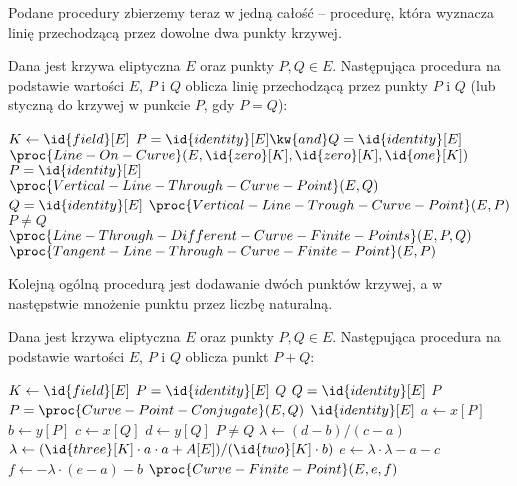Podane procedury zbierzemy teraz w jedną całość --
procedurę, która wyznacza linię przechodzącą przez dowolne dwa punkty krzywej.

\begin{algorithm}
Dana jest krzywa eliptyczna $E$
oraz punkty $P, Q \in E$.
Następująca procedura
na podstawie wartości $E$, $P$ i $Q$
oblicza
linię przechodzącą przez punkty $P$ i $Q$
(lub styczną do krzywej w punkcie $P$, gdy $P = Q$):

\begin{codebox}
\li
    $K \gets \id{field}[E]$
\li
    \If $P = \id{identity}[E] \kw{ and } Q = \id{identity}[E]$
\li
        \Then
            \Return $\proc{Line-On-Curve}(E, \id{zero}[K], \id{zero}[K], \id{one}[K])$
        \End
\li
    \If $P = \id{identity}[E]$
\li
        \Then
            \Return $\proc{Vertical-Line-Through-Curve-Point}(E, Q)$
        \End
\li
    \If $Q = \id{identity}[E]$
\li
        \Then
            \Return $\proc{Vertical-Line-Trough-Curve-Point}(E, P)$
        \End
\li
    \If $P \neq Q$
\li
        \Then
            \Return $\proc{Line-Through-Different-Curve-Finite-Points}(E, P, Q)$
\li
        \Else
            \Return $\proc{Tangent-Line-Through-Curve-Finite-Point}(E, P)$
        \End
\end{codebox}
\end{algorithm}

Kolejną ogólną procedurą jest dodawanie dwóch punktów krzywej,
a w następstwie mnożenie punktu przez liczbę naturalną.

\begin{algorithm}
Dana jest krzywa eliptyczna $E$
oraz punkty $P, Q \in E$.
Następująca procedura
na podstawie wartości $E$, $P$ i $Q$
oblicza
punkt $P + Q$:

\begin{codebox}
\li
    $K \gets \id{field}[E]$
\li
    \If $P = \id{identity}[E]$
\li
        \Then
            \Return $Q$
        \End
\li
    \If $Q = \id{identity}[E]$
\li
        \Then
            \Return $P$
        \End
\li
    \If $P = \proc{Curve-Point-Conjugate}(E, Q)$
\li
        \Then
            \Return $\id{identity}[E]$
        \End
\li
    $a \gets x[P]$
\li
    $b \gets y[P]$
\li
    $c \gets x[Q]$
\li
    $d \gets y[Q]$
\li
    \If $P \neq Q$
\li
        \Then
            $\lambda \gets (d - b)/(c - a)$
\li
        \Else
            $\lambda \gets (\id{three}[K]\cdot a\cdot a + A[E])/(\id{two}[K]\cdot b)$
        \End
\li
    $e \gets \lambda\cdot\lambda - a - c$
\li
    $f \gets -\lambda\cdot(e - a) - b$
\li
    \Return $\proc{Curve-Finite-Point}(E, e, f)$
\end{codebox}
\end{algorithm}

